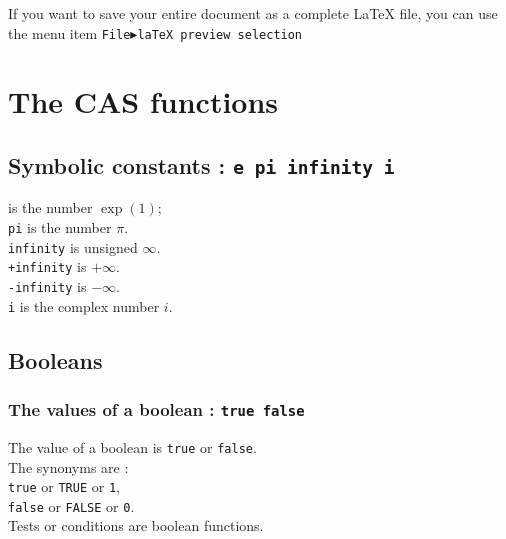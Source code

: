 \documentclass[a4paper,11pt]{book}
\begin{document}
If you want to save your entire document as a complete \LaTeX{} file,
you can use the menu item \texttt{File$\blacktriangleright$laTeX
preview selection}


\chapter{The CAS functions}\label{sec:cas}

\section{Symbolic constants : {\tt e pi infinity i}}
 is the number $\exp(1)$;\\ 
{\tt pi} is the number $\pi$.\\
{\tt infinity} is unsigned $\infty$.\\
{\tt +infinity} is $+\infty$.\\
{\tt -infinity} is $-\infty$.\\
{\tt i} is the complex number $i$.

\section{Booleans}
\subsection{The values of a boolean : {\tt true false}}
The value of a boolean is {\tt true} or {\tt false}.\\
The synonyms are :\\
{\tt true} or {\tt TRUE} or {\tt 1},\\
{\tt false} or {\tt FALSE} or {\tt 0}.\\
Tests or conditions are boolean functions.
\end{document}
